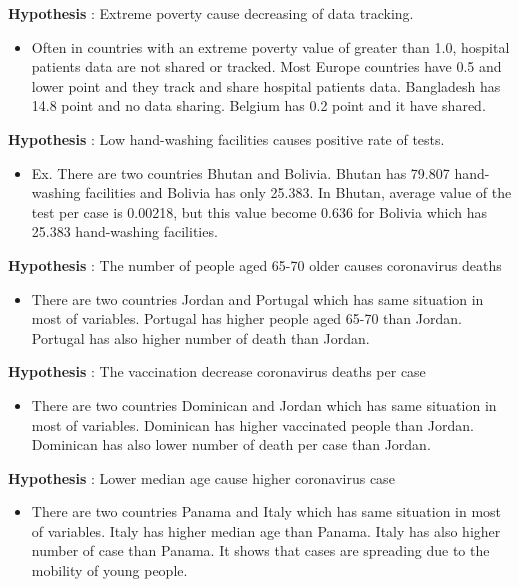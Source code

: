\documentclass[a4 paper]{article}
\numberwithin{equation}{section}
\newcommand{\0}{\mathbf{0}}
\begin{document}
\textbf{Hypothesis }: Extreme poverty cause decreasing of data tracking.
\begin{itemize}
\item Often in countries with an extreme poverty value of greater than 1.0, hospital patients data are not shared or tracked. Most Europe countries have 0.5 and lower point and they track and share hospital patients data. Bangladesh has 14.8 point and no data sharing. Belgium has 0.2 point and it have shared.
\end{itemize}
\hfill \break

\textbf{Hypothesis }: Low hand-washing facilities causes positive rate of tests.
\begin{itemize}
\item   Ex. There are two countries Bhutan and Bolivia. Bhutan has 79.807 hand-washing facilities and Bolivia has only 25.383. In Bhutan, average value of the test per case is 0.00218, but this value become 0.636 for Bolivia which has 25.383 hand-washing facilities.
\end{itemize}
\hfill \break

\newpage
\textbf{Hypothesis }: The number of people aged 65-70 older causes coronavirus deaths
\begin{itemize}
\item There are two countries Jordan and Portugal which has same situation in most of variables. Portugal has higher people aged 65-70 than Jordan. Portugal has also higher number of death than Jordan. 
\end{itemize}
\hfill \break

\textbf{Hypothesis }: The vaccination decrease coronavirus deaths per case 
\begin{itemize}
\item There are two countries Dominican and Jordan which has same situation in most of variables. Dominican has higher vaccinated people than Jordan. Dominican has also lower number of death per case than Jordan. 
\end{itemize}
\hfill \break

\textbf{Hypothesis }: Lower median age cause higher coronavirus case
\begin{itemize}
\item   There are two countries Panama and Italy which has same situation in most of variables. Italy has higher median age than Panama. Italy has also higher number of case than Panama. It shows that cases are spreading due to the mobility of young people. 
\end{itemize}
\hfill \break
\end{document}

